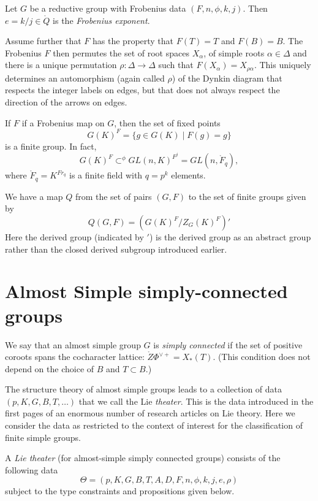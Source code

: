 Let $G$ be a reductive group with Frobenius data $(F,n,\phi,k,j)$.
Then $e = k/j\in\ring{Q}$ is the {\it Frobenius exponent}.

Assume further that $F$ has the property that $F(T)=T$ and $F(B)=B$.
The Frobenius $F$ then permutes the set of root spaces $X_\alpha$, of
simple roots $\alpha\in \Delta$ and there is a unique permutation
$\rho:\Delta\to\Delta$ such that $F(X_\alpha) = X_{\rho\alpha}$.  This
uniquely determines an automorphism (again called $\rho$) of the
Dynkin diagram that respects the integer labels on edges, but that
does not always respect the direction of the arrows on edges.

If $F$ if a Frobenius map on $G$, then the set of fixed points
\[
G(K)^F = \{ g \in G(K) \mid F(g) = g\}
\]
is a finite group. In fact,
\[
G(K)^F \subset^\phi GL(n,K)^{F^j} = GL(n,\ring{F}_{q}),
\]
where $\ring{F}_q = K^{Fr_q}$ is a finite field with $q=p^k$
elements.

We have a map $Q$ from the set of pairs $(G,F)$ to the set of finite
groups given by
\[
Q(G,F) = (G(K)^F/Z_G(K)^F)'
\]
Here the derived group (indicated by $'$) is the derived group as an
abstract group rather than the closed derived subgroup introduced
earlier.


\section{Almost Simple simply-connected groups}

We say that an almost simple group $G$ is {\it simply connected} if
the set of positive coroots spans the cocharacter lattice:
$\ring{Z}\Phi^{\vee+} = X_*(T)$.  (This condition does not depend on
the choice of $B$ and $T\subset B$.)

The structure theory of almost simple groups leads to a collection
of data $(p,K,G,B,T,\ldots)$ that we call the Lie {\it theater}.
This is the data introduced in the first pages of an enormous number
of research articles on Lie theory.  Here we consider the data
as restricted to the context of interest for the classification
of finite simple groups.

\begin{definition}  A {\it Lie theater} (for almost-simple simply connected
  groups) consists of the following data
  \[
  \Theta = (p,K,G,B,T,A,D,F,n,\phi,k,j,e,\rho)
  \]
  subject to the type constraints and propositions given below.
\end{definition}

